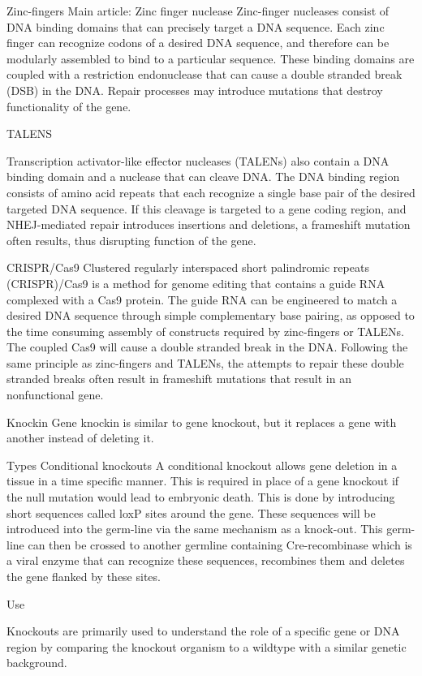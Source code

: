 Zinc-fingers
Main article: Zinc finger nuclease
Zinc-finger nucleases consist of DNA binding domains that can precisely target a DNA sequence. Each zinc finger can recognize codons of a desired DNA sequence, and therefore can be modularly assembled to bind to a particular sequence. These binding domains are coupled with a restriction endonuclease that can cause a double stranded break (DSB) in the DNA. Repair processes may introduce mutations that destroy functionality of the gene.

TALENS

Transcription activator-like effector nucleases (TALENs) also contain a DNA binding domain and a nuclease that can cleave DNA. The DNA binding region consists of amino acid repeats that each recognize a single base pair of the desired targeted DNA sequence. If this cleavage is targeted to a gene coding region, and NHEJ-mediated repair introduces insertions and deletions, a frameshift mutation often results, thus disrupting function of the gene.

CRISPR/Cas9
Clustered regularly interspaced short palindromic repeats (CRISPR)/Cas9 is a method for genome editing that contains a guide RNA complexed with a Cas9 protein. The guide RNA can be engineered to match a desired DNA sequence through simple complementary base pairing, as opposed to the time consuming assembly of constructs required by zinc-fingers or TALENs. The coupled Cas9 will cause a double stranded break in the DNA. Following the same principle as zinc-fingers and TALENs, the attempts to repair these double stranded breaks often result in frameshift mutations that result in an nonfunctional gene.

Knockin
Gene knockin is similar to gene knockout, but it replaces a gene with another instead of deleting it.

Types
Conditional knockouts
A conditional knockout allows gene deletion in a tissue in a time specific manner. This is required in place of a gene knockout if the null mutation would lead to embryonic death. This is done by introducing short sequences called loxP sites around the gene. These sequences will be introduced into the germ-line via the same mechanism as a knock-out. This germ-line can then be crossed to another germline containing Cre-recombinase which is a viral enzyme that can recognize these sequences, recombines them and deletes the gene flanked by these sites.

Use

Knockouts are primarily used to understand the role of a specific gene or DNA region by comparing the knockout organism to a wildtype with a similar genetic background.

